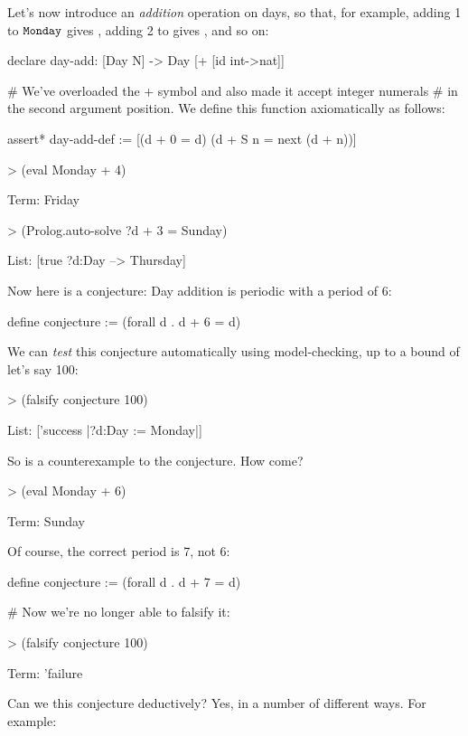 Let's now introduce an {\em addition\/} operation on days, so that, for example, adding 1 to $\smtt{Monday}$ gives , adding 2 to 
gives , and so on: 
\begin{tcAthena}
declare day-add: [Day N] -> Day [+ [id int->nat]]

# We've overloaded the + symbol and also made it accept integer numerals 
# in the second argument position. We define this function axiomatically as follows: 

assert* day-add-def := [(d + 0 = d)
                        (d + S n = next (d + n))]

> (eval Monday + 4)

Term: Friday

> (Prolog.auto-solve ?d + 3 = Sunday)

List: [true {?d:Day --> Thursday}]
\end{tcAthena}
Now here is a conjecture: Day addition is periodic with a period of 6: 
\begin{tcAthena}
define conjecture := (forall d . d + 6 = d) 
\end{tcAthena}
We can {\em test\/} this conjecture automatically using model-checking, up to a bound of let's say 100: 
\begin{tcAthena}
> (falsify conjecture 100)

List: ['success |{?d:Day := Monday}|]
\end{tcAthena}
So  is a counterexample to the conjecture. How come? 
\begin{tcAthena}
> (eval Monday + 6)

Term: Sunday
\end{tcAthena}
Of course, the correct period is 7, not 6: 
\begin{tcAthena}
define conjecture := (forall d . d + 7 = d) 

# Now we're no longer able to falsify it: 

> (falsify conjecture 100)

Term: 'failure
\end{tcAthena}
Can we  this conjecture deductively? Yes, in a number of different ways.
For example:

